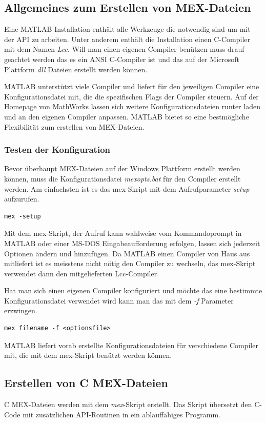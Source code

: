 \documentclass[10pt, bigheadings]{scrartcl}
\begin{document}
\subsection{Allgemeines zum Erstellen von MEX-Dateien}
Eine MATLAB Installation enthält alle Werkzeuge die notwendig
sind um mit der API zu arbeiten. Unter anderem enthält
die Installation einen C-Compiler mit dem Namen \textit{Lcc}.
Will man einen eigenen Compiler benützen muss drauf geachtet
werden das es ein ANSI C-Compiler ist und das auf
der Microsoft Plattform \textit{dll} Dateien erstellt werden können.

MATLAB unterstützt viele Compiler und liefert für den jeweiligen
Compiler eine Konfigurationsdatei mit, die die spezifischen Flags
der Compiler steuern. Auf der Homepage von MathWorks lassen sich
weitere Konfigurationsdateien runter laden und an den eigenen
Compiler anpassen. MATLAB bietet so eine bestmögliche Flexibilität
zum erstellen von MEX-Dateien.

\subsubsection*{Testen der Konfiguration}
Bevor überhaupt MEX-Dateien auf der Windows Plattform erstellt
werden können, muss die Konfigurationsdatei \textit{mexopts.bat} für den
Compiler erstellt werden. Am einfachsten ist es das mex-Skript mit
dem Aufrufparameter \textit{setup} aufzurufen.
\begin{verbatim}
mex -setup
\end{verbatim}

Mit dem mex-Skript, der Aufruf kann wahlweise vom Kommandoprompt in MATLAB
oder einer MS-DOS Eingabeaufforderung erfolgen, lassen sich jederzeit Optionen
ändern und hinzufügen. Da MATLAB einen Compiler von Haus aus mitliefert
ist es meisstens nicht nötig den Compiler zu wechseln, das mex-Skript
verwendet dann den mitgelieferten Lcc-Compiler.

Hat man sich einen eigenen Compiler konfiguriert und möchte
das eine bestimmte Konfigurationsdatei verwendet wird kann man
das mit dem \textit{-f} Parameter erzwingen.
\begin{verbatim}
mex filename -f <optionsfile>
\end{verbatim}

MATLAB liefert vorab erstellte Konfigurationsdateien für verschiedene
Compiler mit, die mit dem mex-Skript benützt werden können.

\subsection{Erstellen von C MEX-Dateien}
C MEX-Dateien werden mit dem  \textit{mex}-Skript erstellt. Das Skript
übersetzt den C-Code mit zusätzlichen API-Routinen in ein ablauffähiges
Programm.
\end{document}
